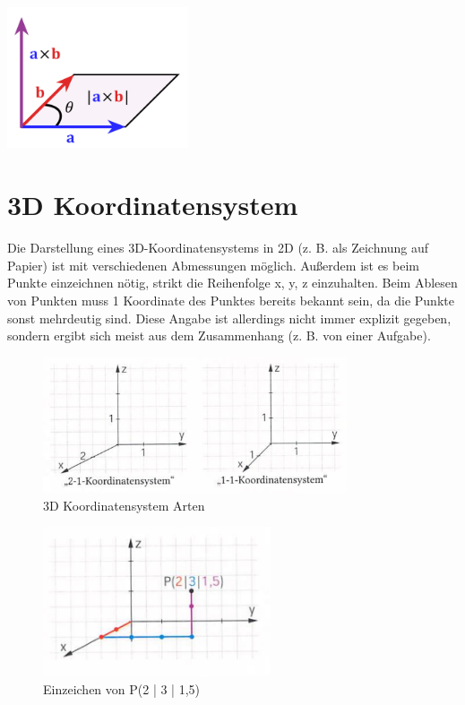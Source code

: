 \includegraphics[width=0.4\textwidth]{images/cross-p.png}


\section{3D Koordinatensystem}

Die Darstellung eines 3D-Koordinatensystems in 2D (z. B. als Zeichnung auf Papier)
ist mit verschiedenen Abmessungen möglich. Außerdem ist es beim Punkte einzeichnen nötig,
strikt die Reihenfolge x, y, z einzuhalten.
Beim Ablesen von Punkten muss 1 Koordinate des Punktes bereits bekannt sein, da die Punkte
sonst mehrdeutig sind. Diese Angabe ist allerdings nicht immer explizit gegeben,
sondern ergibt sich meist aus dem Zusammenhang (z. B. von einer Aufgabe).

\begin{figure}[H]
    \includegraphics[width=0.8\textwidth]{images/3d-cord-systems.png}
    \caption{3D Koordinatensystem Arten}
\end{figure}

\begin{figure}[H]
    \includegraphics[width=0.6\textwidth]{images/3d-draw-point.png}
    \caption{Einzeichen von P(2 | 3 | 1,5)}
\end{figure}


